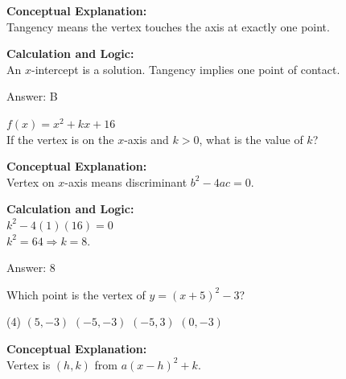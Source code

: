 \documentclass[11pt,paper=a4,answers]{exam}
\begin{document}
\begin{questions}
\begin{solution}
\textbf{Conceptual Explanation:} \\
Tangency means the vertex touches the axis at exactly one point.

\vspace{20pt}

\textbf{Calculation and Logic:} \\
An $x$-intercept is a solution. Tangency implies one point of contact.

\vspace{25pt}

Answer: \colorbox{yellow!100}{B}
\end{solution}

\vspace{40pt}

\question
$f(x) = x^2 + kx + 16$ \\
If the vertex is on the $x$-axis and $k > 0$, what is the value of $k$?

\begin{solution}
\textbf{Conceptual Explanation:} \\
Vertex on $x$-axis means discriminant $b^2-4ac = 0$.

\vspace{20pt}

\textbf{Calculation and Logic:} \\
$k^2 - 4(1)(16) = 0$ \\
$k^2 = 64 \Rightarrow k = 8$.

\vspace{25pt}

Answer: \colorbox{yellow!100}{8}
\end{solution}

\vspace{40pt}

\question
Which point is the vertex of $y = (x+5)^2 - 3$?
\begin{tasks}(4)
    \task $(5, -3)$
    \task $(-5, -3)$
    \task $(-5, 3)$
    \task $(0, -3)$
\end{tasks}

\begin{solution}
\textbf{Conceptual Explanation:} \\
Vertex is $(h, k)$ from $a(x-h)^2+k$.

\vspace{20pt}


\end{solution}
\end{questions}
\end{document}
